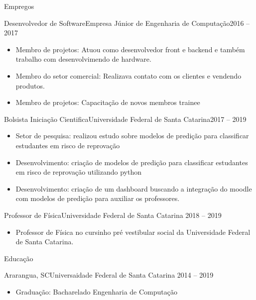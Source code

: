 \documentclass[]{mcdowellcv}
\begin{document}
	\makeheader
	
	\begin{cvsection}{Empregos}
		\begin{cvsubsection}{Desenvolvedor de Software}{Empresa Júnior de Engenharia de Computação}{2016 -- 2017}
			~\\
			\begin{itemize}
				\item Membro de projetos: Atuou como desenvolvedor front e backend e também trabalho com desenvolvimendo de hardware.
				\item Membro do setor comercial: Realizava contato com os clientes e vendendo produtos.
				\item Membro de projetos: Capacitação de novos membros trainee
			\end{itemize}
		\end{cvsubsection}
		
		\begin{cvsubsection}{Bolsista Iniciação Cientifica}{Universidade Federal de Santa Catarina}{2017 -- 2019}
			~\\
			\begin{itemize}
				\item Setor de pesquisa: realizou estudo sobre modelos de predição para classificar estudantes em risco de reprovação
				\item Desenvolvimento: criação de modelos de predição para classificar estudantes em risco de reprovação utilizando python
				\item Desenvolvimento: criação de um dashboard buscando a integração do moodle com modelos de predição para auxiliar os professores.
			\end{itemize}
		\end{cvsubsection}
		
		\begin{cvsubsection}{Professor de Física}{Universidade Federal de Santa Catarina}{ 2018 -- 2019}	
			~\\			
			\begin{itemize}
				\item Professor de Física no cursinho pré vestibular social da Universidade Federal de Santa Catarina.
			\end{itemize}
		\end{cvsubsection}
		
		
	\end{cvsection}
	
	\begin{cvsection}{Educação}
		\begin{cvsubsection}{Ararangua, SC}{Universaidade Federal de Santa Catarina}{ 2014 -- 2019}
			~\\
			\begin{itemize}
				\item Graduação: Bacharelado Engenharia de Computação 
			\end{itemize}
		\end{cvsubsection}
	\end{cvsection}
	
\end{document}
